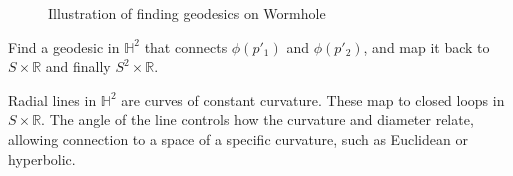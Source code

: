 \begin{figure}[h]
\label{fig:the_figure}
\caption{Illustration of finding geodesics on Wormhole}
\end{figure}

Find a geodesic in $\mathbb{H}^2$ that connects $\phi(p'_1)$ and $\phi(p'_2)$, and map it back to $S \times \mathbb{R}$ and finally $S^2 \times \mathbb{R}$.

Radial lines in $\mathbb{H}^2$ are curves of constant curvature. These map to closed loops in $S \times \mathbb{R}$. The angle of the line controls how the curvature and diameter relate, allowing connection to a space of a specific curvature, such as Euclidean or hyperbolic.
